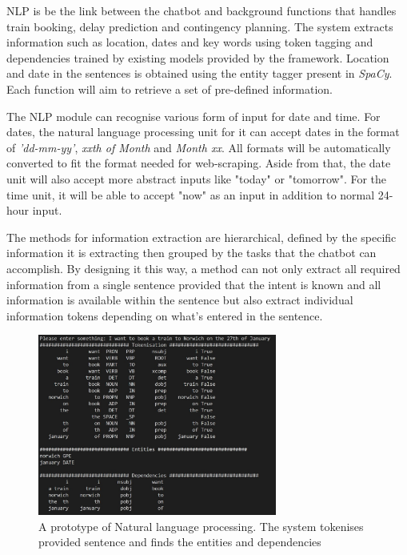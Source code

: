 \documentclass[11pt]{article}
\begin{document}
NLP is be the link between the chatbot and background functions that handles train booking, delay prediction and contingency planning. The system extracts information such as location, dates and key words using token tagging and dependencies trained by existing models provided by the framework. Location and date in the sentences is obtained using the entity tagger present in \textit{SpaCy}. Each function will aim to retrieve a set of pre-defined information.

The NLP module can recognise various form of input for date and time. For dates, the natural language processing unit for it can accept dates in the format of \textit{'dd-mm-yy'}, \textit{xxth of Month} and \textit{Month xx}. All formats will be automatically converted to fit the format needed for web-scraping. Aside from that, the date unit will also accept more abstract inputs like "today" or "tomorrow". For the time unit, it will be able to accept "now" as an input in addition to normal 24-hour input.

The methods for information extraction are hierarchical, defined by the specific information it is extracting then grouped by the tasks that the chatbot can accomplish. By designing it this way, a method can not only extract all required information from a single sentence provided that the intent is known and all information is available within the sentence but also extract individual information tokens depending on what's entered in the sentence.

\begin{figure}[!htb]
	\centering
	\includegraphics[width=0.7\textwidth]{NLP_Prototype}
	\caption{A prototype of Natural language processing. The system tokenises provided sentence and finds the entities and dependencies }\label{fig:NLP_Prototype}
\end{figure}
\end{document}
